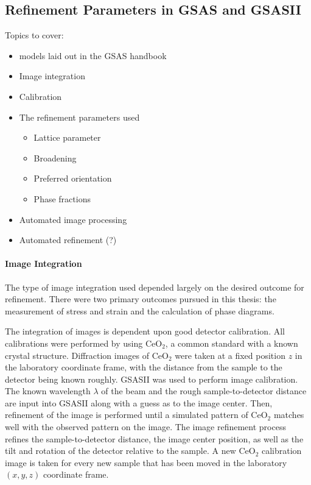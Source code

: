 \subsection{Refinement Parameters in GSAS and GSASII}
Topics to cover:
\begin{itemize}
	\item models laid out in the GSAS handbook
	\item Image integration
	\item Calibration
	\item The refinement parameters used \begin{itemize}
		\item Lattice parameter
		\item Broadening
		\item Preferred orientation
		\item Phase fractions
		\end{itemize}
	\item Automated image processing
	\item Automated refinement (?)
\end{itemize}

\paragraph{Image Integration}
The type of image integration used depended largely on the desired outcome for refinement. There were two primary outcomes pursued in this thesis: the measurement of stress and strain and the calculation of phase diagrams.

The integration of images is dependent upon good detector calibration. All calibrations were performed by using CeO$_2$, a common standard with a known crystal structure. Diffraction images of CeO$_2$ were taken at a fixed position $z$ in the laboratory coordinate frame, with the distance from the sample to the detector being known roughly. GSASII was used to perform image calibration. The known wavelength $\lambda$ of the beam and the rough sample-to-detector distance are input into GSASII along with a guess as to the image center. Then, refinement of the image is performed until a simulated pattern of CeO$_2$ matches well with the observed pattern on the image. The image refinement process refines the sample-to-detector distance, the image center position, as well as the tilt and rotation of the detector relative to the sample. A new CeO$_2$ calibration image is taken for every new sample that has been moved in the laboratory $(x,y,z)$ coordinate frame.

